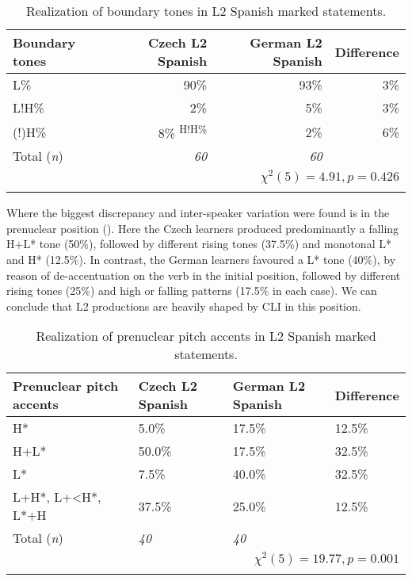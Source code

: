 \begin{table}
\begin{tabularx}{\textwidth}{Qrrr}

\lsptoprule

{Boundary tones} & {Czech L2 Spanish} & {German L2 Spanish} & {Difference}\\
\midrule
L\% &  90\% &  93\% &  3\%\\
L!H\% &  2\% &  5\% &  3\%\\
(!)H\% &  8\% \textsuperscript{H!H\%} &  2\% &  6\%\\
\midrule
Total (\textit{n}) & {\itshape 60} & {\itshape 60} &  \\
\\
\lspbottomrule
\end{tabularx}

\caption{Realization of boundary tones in L2 Spanish marked statements.}
\label{tab:4.12}
\end{table}

Where the biggest discrepancy and inter-speaker variation were found is in the prenuclear position (). Here the Czech learners produced predominantly a falling H+L* tone (50\%), followed by different rising tones (37.5\%) and monotonal L* and H* (12.5\%). In contrast, the German learners favoured a L* tone (40\%), by reason of de-accentuation on the verb in the initial position, followed by different rising tones (25\%) and high or falling patterns (17.5\% in each case). We can conclude that L2 productions are heavily shaped by CLI in this position.

\begin{table}
\begin{tabularx}{\textwidth}{lYYY}

\lsptoprule

{Prenuclear pitch accents} & {Czech L2 Spanish} & {German L2 Spanish} & {Difference}\\
\midrule
H* &  5.0\% &  17.5\% &  12.5\%\\
H+L* &  50.0\% &  17.5\% &  32.5\%\\
L* &  7.5\% &  40.0\% &  32.5\%\\
L+H*, L+<H*, L*+H &  37.5\% &  25.0\% &  12.5\%\\
\midrule
Total (\textit{n}) & {\itshape 40} & {\itshape 40} &  \\
\\
\lspbottomrule
\end{tabularx}

\caption{Realization of prenuclear pitch accents in L2 Spanish marked statements.}
\label{tab:4.13}
\end{table}

